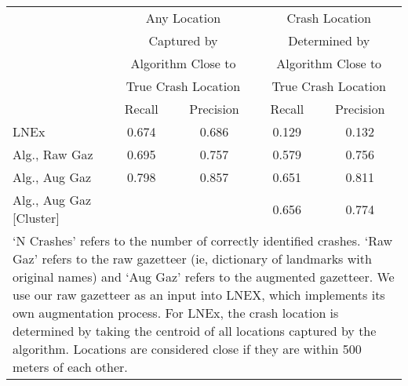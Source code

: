 \begin{tabular}{l cc | cc} \hline  & \multicolumn{2}{c|}{Any Location} & \multicolumn{2}{c}{Crash Location } \\  & \multicolumn{2}{c|}{Captured by} & \multicolumn{2}{c}{Determined by} \\  & \multicolumn{2}{c|}{Algorithm Close to} & \multicolumn{2}{c}{Algorithm Close to} \\  & \multicolumn{2}{c|}{True Crash Location} & \multicolumn{2}{c}{True Crash Location} \\  \hline  & Recall & Precision & Recall & Precision \\ \hline LNEx & 0.674  & 0.686  & 0.129  & 0.132  \\ Alg., Raw Gaz & 0.695  & 0.757  & 0.579  & 0.756  \\ Alg., Aug Gaz & 0.798  & 0.857  & 0.651  & 0.811  \\ Alg., Aug Gaz [Cluster] &  & & 0.656  & 0.774  \\ \hline \multicolumn{5}{p{11cm}}{`N Crashes' refers to the number of correctly 
    identified crashes. `Raw Gaz' refers to the raw gazetteer (ie, dictionary of 
    landmarks with original names) and `Aug Gaz' refers to the augmented gazetteer. 
    We use our raw gazetteer as an input into LNEX, which implements its own augmentation
    process. For LNEx, the crash location is determined by taking the centroid of all 
    locations captured by the algorithm. Locations are considered close if they are 
    within 500 meters of each other.} \end{tabular} 